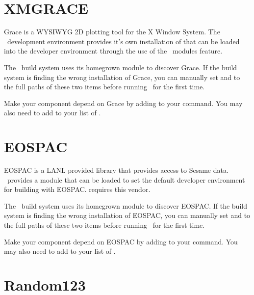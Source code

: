 
\section{XMGRACE}
\label{appsec:grace} 

Grace is a WYSIWYG 2D plotting tool for the X Window System.  The \draco\ development environment provides it's own installation of  that can be loaded into the developer environment through the use of the \draco\ modules feature.

The \draco\ build system uses its homegrown  module to discover Grace.  If the build system is finding the wrong installation of Grace, you can manually set  and  to the full paths of these two items before running \cmake\ for the first time.

Make your component depend on Grace by adding  to your  command.  You may also need to add  to your list of .

\section{EOSPAC}
\label{appsec:eospac} 

EOSPAC is a LANL provided library that provides access to Sesame data.  \draco\ provides a module that can be loaded to set the default developer environment for building with EOSPAC.   requires this vendor.

The \draco\ build system uses its homegrown  module to discover EOSPAC.  If the build system is finding the wrong installation of EOSPAC, you can manually set  and  to the full paths of these two items before running \cmake\ for the first time.

Make your component depend on EOSPAC by adding  to your  command.  You may also need to add  to your list of .

\section{Random123}
\label{appsec:random123} 


